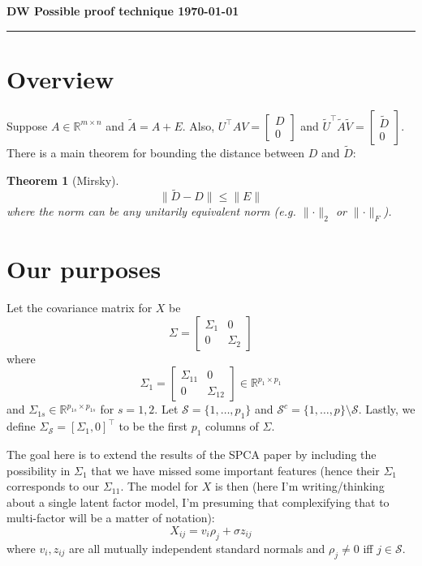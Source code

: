 \documentclass[11pt]{article}
\newtheorem{theorem}{Theorem}[section]
\newcommand{\R}{\mathbb{R}}
\newcommand{\norm}[1]{\lVert #1 \rVert}
\renewcommand{\S}{\mathcal{S}}
\begin{document}
\noindent\textbf{\sc DW
        \hfill Possible proof technique
        \hfill \today}
\rule{6.5in}{1pt}
\section{Overview}
Suppose $A \in \R^{m\times n}$ and $\tilde{A} = A + E$.  Also, $U^{\top}AV = \begin{bmatrix} D \\ 0 \end{bmatrix}$ and $\tilde{U}^{\top}\tilde{A}\tilde{V} = \begin{bmatrix} \tilde{D} \\ 0 \end{bmatrix}$.
There is a main theorem for bounding the distance between $D$ and $\tilde{D}$:

\begin{theorem}[Mirsky]
\[
\norm{\tilde{D} - D} \leq \norm{E}
\]
where the norm can be any unitarily equivalent norm (e.g. $\norm{\cdot}_2$ or $\norm{\cdot}_F$).
\end{theorem}

\section{Our purposes}
Let the covariance matrix for $X$ be
\[
\Sigma 
= 
 \begin{bmatrix} 
 \Sigma_{1} & 0  \\ 0 & \Sigma_2 
 \end{bmatrix}
\]
where
\[
\Sigma_1 
= 
 \begin{bmatrix} 
 \Sigma_{11} & 0  \\ 0 & \Sigma_{12} 
 \end{bmatrix} \in \R^{p_1 \times p_1}
\]
and $\Sigma_{1s} \in \R^{p_{1s} \times p_{1s}}$ for $s = 1,2$.  Let $\S = \{1,\ldots,p_1\}$ and $\S^c = \{1,\ldots,p\} \setminus \S$.  Lastly, we define $\Sigma_\S = [\Sigma_1, 0]^{\top}$
to be the first $p_1$ columns of $\Sigma$.

The goal here is to extend the results of the SPCA paper by including the possibility in $\Sigma_1$ that we have missed some important features  (hence their $\Sigma_1$ corresponds 
to our $\Sigma_{11}$.  The model for $X$ is then (here I'm writing/thinking about a single latent factor model, I'm presuming that complexifying that to multi-factor will be a matter
of notation):
\[
X_{ij} = v_i \rho_j + \sigma z_{ij}
\]
where $v_i,z_{ij}$ are all mutually independent standard normals and $\rho_j \neq 0$ iff $j \in \S$.
\end{document}
